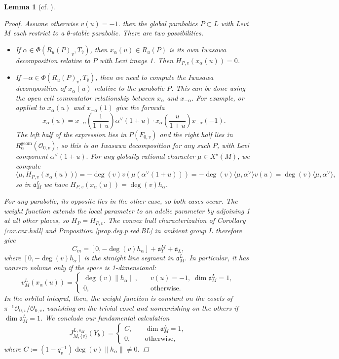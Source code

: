 \documentclass[openany]{amsbook}
\newtheorem{lemma}[theorem]{Lemma}
\theoremstyle{definition}
\theoremstyle{remark}
\numberwithin{equation}{section}
\renewcommand{\O}{\mathcal{O}}
\newcommand{\ol}[1]{\overline{#1}}
\renewcommand{\-}{\operatorname{-}}
\renewcommand{\a}{\mathfrak{a}}
\newcommand{\on}[1]{\operatorname{#1}}
\begin{document}
\begin{lemma}[{cf. \cite[Lemme 17.6.2, Lemme 17.8.1]{CLII}}]
\begin{proof}
        Assume otherwise $v(u) = -1$. then the global parabolics $P \subset L$ with Levi $M$ each restrict to a $\theta$-stable parabolic. There are two possibilities.
        \begin{itemize}
        \item If $\alpha \in \Phi(R_u(P)_{\ol{v}},T_{\ol{v}})$, then $x_\alpha(u) \in R_u(P)$ is its own Iwasawa decomposition relative to $P$ with Levi image 1. Then $H_{P, v}(x_\alpha(u)) = 0$.
        \item If $-\alpha \in \Phi(R_u(P)_{\ol{v}}, T_{\ol{v}})$, then we need to compute the Iwasawa decomposition of $x_\alpha(u)$ relative to the parabolic $P$. This can be done using the open cell commutator relationship between $x_\alpha$ and $x_{-\alpha}$. For example, \cite[Theorem 4.2.6.(2)]{conradrgs} or \cite[Exp.\ XX, Th\'eor\`me 2.1]{SGAIII} applied to $x_\alpha(u)$ and $x_{-\alpha}(1)$ give the formula
        $$
            x_\alpha(u) =x_{-\alpha}\left(\frac{1}{1 + u}\right) \alpha^\vee(1 + u)  \cdot x_\alpha\left( \frac{u}{1 + u} \right) x_{-\alpha}(-1).
        $$
        The left half of the expression lies in $P(F_{0,v})$ and the right half lies in $R_\alpha^{\on{geom}}(\O_{0,v})$, so this is an Iwasawa decomposition for any such $P$, with Levi component $\alpha^\vee(1+u).$ For any globally rational character $\mu \in X^\star(M)$, we compute
        $$
            \langle \mu, H_{P,v}(x_\alpha(u)) \rangle = - \deg(v) v(\mu(\alpha^\vee(1 + u))) = -\deg(v)\langle \mu, \alpha^\vee \rangle v(u) = \deg(v) \langle \mu, \alpha^\vee \rangle,
        $$
        so in $\a_M^L$ we have $H_{P,v}(x_\alpha(u)) = \deg(v) h_\alpha$. 
        \end{itemize} 
        For any parabolic, its opposite lies in the other case, so both cases occur. The weight function extends the local parameter to an adelic parameter by adjoining 1 at all other places, so $H_P = H_{P,v}$. The convex hull characterization of Corollary \ref{cor.cvx.hull} and Proposition \ref{prop.deg.p.red.BL} in ambient group $L$ therefore give
        $$
            C_m = [0, -\deg(v) h_\alpha] + \a_T^M + \a_L,
        $$
        where $[0, -\deg(v) h_\alpha]$ is the straight line segment in $\a_M^L$. In particular, it has nonzero volume only if the space is 1-dimensional:
        $$
            v_M^L(x_\alpha(u)) = \begin{cases}
                \deg(v) \|h_\alpha\|, \quad & v(u) = -1, \;\dim \a_M^L = 1,\\
                0, & \text{otherwise.}
            \end{cases}
        $$
        In the orbital integral, then, the weight function is constant on the cosets of $\pi^{-1} \O_{0,v} / \O_{0,v}$, vanishing on the trivial coset and nonvanishing on the others if $\dim \a_M^L = 1$. We conclude our fundamental calculation
        $$
            J_{M,\{v\}}^{L,s_M}(Y_b) = \begin{cases} C, \quad & \dim \a_M^L = 1,\\
            0, & \text{otherwise,}
            \end{cases}
        $$
        where $C := (1 - q_v^{-1}) \deg(v) \|h_\alpha\| \neq 0$.


\end{proof}
\end{lemma}
\end{document}
